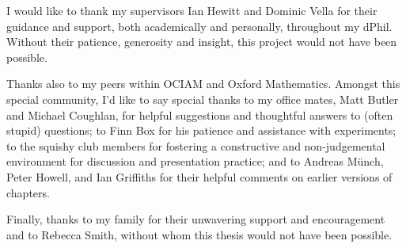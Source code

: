 \begin{acknowledgements}
I would like to thank my supervisors Ian Hewitt and Dominic Vella for their guidance and support, both academically and personally, throughout my dPhil. Without their patience, generosity and insight, this project would not have been possible.

Thanks also to my peers within OCIAM and Oxford Mathematics. Amongst this special community, I'd like to say special thanks to my office mates, Matt Butler and Michael Coughlan, for helpful suggestions and thoughtful answers to (often stupid) questions; to Finn Box for his patience and assistance with experiments; to the squishy club members for fostering a constructive and non-judgemental environment for discussion and presentation practice; and to Andreas M\"{u}nch, Peter Howell, and Ian Griffiths for their helpful comments on earlier versions of chapters. 

Finally, thanks to my family for their unwavering support and encouragement and to Rebecca Smith, without whom this thesis would not have been possible. 
\end{acknowledgements}